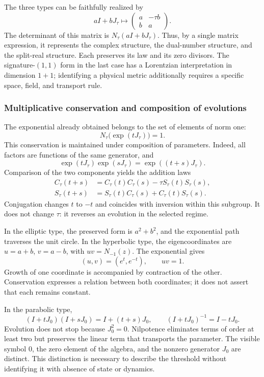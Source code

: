 The three types can be faithfully realized by
\[
 aI+bJ_\tau\longmapsto
 \begin{pmatrix}a&-\tau b\\b&a\end{pmatrix}.
\]
The determinant of this matrix is \(N_\tau(aI+bJ_\tau)\). Thus, by a
single matrix expression, it represents the complex structure, the
dual-number structure, and the split-real structure.
Each preserves its law and its zero divisors. The signature-\((1,1)\)
form in the last case has a Lorentzian interpretation in dimension
\(1+1\); identifying a physical metric additionally requires a specific space,
field, and transport rule.

\subsubsection{Multiplicative conservation and composition of evolutions}
\label{trit-ampl-evoluciones}

The exponential already obtained belongs to the set of elements of norm one:
\[
 N_\tau\bigl(\exp(tJ_\tau)\bigr)=1.
\]
This conservation is maintained under composition of parameters. Indeed, all
factors are functions of the same generator, and
\[
 \exp(tJ_\tau)\exp(sJ_\tau)=\exp((t+s)J_\tau).
\]
Comparison of the two components yields the addition laws
\begin{align}
 C_\tau(t+s)&=C_\tau(t)C_\tau(s)-\tau S_\tau(t)S_\tau(s),\\
 S_\tau(t+s)&=S_\tau(t)C_\tau(s)+C_\tau(t)S_\tau(s).
\end{align}
Conjugation changes \(t\) to \(-t\) and coincides with inversion within
this subgroup. It does not change \(\tau\): it reverses an evolution in the
selected regime.

In the elliptic type, the preserved form is \(a^2+b^2\), and the exponential
path traverses the unit circle. In the hyperbolic type, the
eigencoordinates are \(u=a+b\), \(v=a-b\), with \(uv=N_{-1}(z)\).
The exponential gives
\[
 (u,v)=(e^t,e^{-t}),\qquad uv=1.
\]
Growth of one coordinate is accompanied by contraction of the other.
Conservation expresses a relation between both coordinates; it does not assert that
each remains constant.

In the parabolic type,
\[
 (I+tJ_0)(I+sJ_0)=I+(t+s)J_0,\qquad
 (I+tJ_0)^{-1}=I-tJ_0.
\]
Evolution does not stop because \(J_0^2=0\). Nilpotence eliminates
terms of order at least two but preserves the linear term that
transports the parameter. The visible symbol \(0\), the zero element of the
algebra, and the nonzero generator \(J_0\) are distinct. This distinction
is necessary to describe the threshold without identifying it with absence of
state or dynamics.

